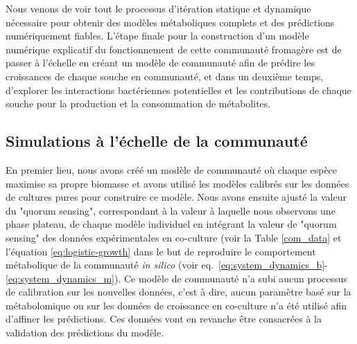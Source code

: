 Nous venons de voir tout le processus d'itération statique et dynamique nécessaire pour obtenir des modèles métaboliques complets et des prédictions numériquement fiables. L'étape finale pour la construction d'un modèle numérique explicatif du fonctionnement de cette communauté fromagère est de passer à l'échelle en créant un modèle de communauté afin de prédire les croissances de chaque souche en communauté, et dans un deuxième temps, d'explorer les interactions bactériennes potentielles et les contributions de chaque souche pour la production et la consommation de métabolites.

\subsection{Simulations à l'échelle de la communauté}
En premier lieu, nous avons créé un modèle de communauté où chaque espèce maximise sa propre biomasse et avons utilisé les modèles calibrés sur les données de cultures pures pour construire ce modèle.
Nous avons ensuite ajusté la valeur du "quorum sensing", correspondant à la valeur à laquelle nous observons une phase plateau, de chaque modèle individuel en intégrant la valeur de "quorum sensing" des données expérimentales en co-culture (voir la Table \ref{com_data} et l'équation \ref{eq:logistic-growth} dans le but de reproduire le comportement métabolique de la communauté \textit{in silico} (voir eq.~\ref{eq:system_dynamics_b}-\ref{eq:system_dynamics_m}). Ce modèle de communauté n'a subi aucun processus de calibration sur les nouvelles données, c'est à dire, aucun paramètre basé sur la métabolomique ou sur les données de croissance en co-culture n'a été utilisé afin d'affiner les prédictions. Ces données vont en revanche être consacrées à la validation des prédictions du modèle.

